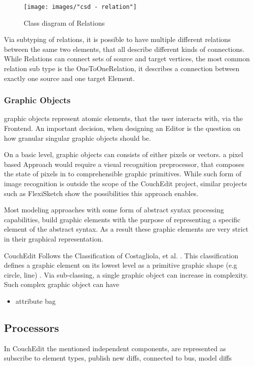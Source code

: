 \begin{figure}[ht]
  \centering
  \texttt{[image: images/"csd - relation"]}
  \caption{Class diagram of Relations}
  \label{fig:relations}
\end{figure}

Via subtyping of relations, it is possible to have multiple different relations between the same two elements, that all describe different kinds of connections. While Relations can connect sets of source and target vertices, the most common relation sub type is the OneToOneRelation, it describes a connection between exactly one source and one target Element. 


\subsubsection{Graphic Objects}
graphic objects represent atomic elements, that the user interacts with, via the Frontend. An important decision, when designing an Editor is the question on how granular singular graphic objects should be. 

On a basic level, graphic objects can consists of either pixels or vectors. a pixel based Approach would require a visual recognition preprocessor, that composes the state of pixels in to comprehensible graphic primitives. While such form of image recognition is outside the scope of the CouchEdit project, similar projects such as FlexiSketch \cite{wuest_flexisketch_2015} show the possibilities this approach enables.

Most modeling approaches with some form of abstract syntax processing capabilities, build graphic elements with the purpose of representing a specific element of the abstract syntax. As a result these graphic elements are very strict in their graphical representation. 

CouchEdit Follows the Classification of Costagliola, et al. \cite{costagliola_classification_2002}. This classification defines a graphic element on its lowest level as a primitive graphic shape (e.g circle, line) . Via sub-classing, a single graphic object can increase in complexity. Such complex graphic object can have  



\begin{itemize}
  \item attribute bag
\end{itemize}


\subsection{Processors}
In CouchEdit the mentioned independent components, are represented as 
subscribe to element types, publish new diffs, connected to bus, model diffs

